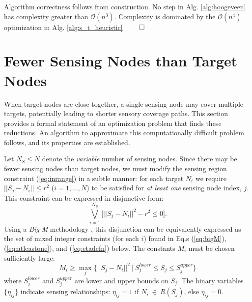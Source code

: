 \documentclass[letterpaper, 10 pt, conference]{ieeeconf}
\theoremstyle{definition}
\newcommand{\Os}{\mathcal{O}}
\begin{document}
Algorithm correctness follows from construction.  No step in Alg. \ref{alg:hoogeveen} has complexity greater than $\Os(n^3)$. Complexity is dominated by the $\Os(n^4)$ optimization in Alg. \ref{alg:s_t_heuristic} $\qed$

\section{Fewer Sensing Nodes than Target Nodes} \label{sec:fewer}

\noindent When target nodes are close together, a single sensing node may  cover multiple targets, potentially leading to shorter sensory coverage paths.  This section provides a formal statement of an optimization problem that finds these reductions. An algorithm to approximate this computationally difficult problem follows, and its properties are established.

Let $N_S\leq N$ denote the {\em variable} number of sensing nodes.
Since there may be fewer sensing nodes than target nodes, we must modify the sensing region constraint (\ref{eq:inrange}) in a subtle manner: for each target $N_i$ we require $||S_j - N_i|| \le r^2$ ($i=1,\ldots,N$) to be satisfied for {\em at least one} sensing node index, $j$.  This constraint can be expressed in disjunctive form:
   \[ \bigvee_{i=1}^{N_S} \big[ ||S_j - N_i||^2-r^2 \le 0 \big] .\]
Using a {\em Big-M} methodology \cite{vecchietti_modeling_2003}, this disjunction can be equivalently expressed as the set of mixed integer constraints (for each $i$) found in Eq.s (\ref{eq:bigM}), (\ref{eq:atleastone}), and (\ref{eq:etadefn}) below.  The constants $M_i$ must be chosen sufficiently large:
   \begin{equation} 
   M_i \ge \max_j\{ ||S_j-N_i||^2\ |\ S_j^{lower} \le S_j \le S_j^{upper}\}
   \end{equation}
where $S_j^{lower}$ and $S_j^{upper}$ are lower and upper bounds on $S_j$.  The binary variables $\{\eta_{ij}\}$ indicate sensing relationships: $\eta_{ij}=1$ if $N_i\ \in \ R(S_j)$, else $\eta_{ij}=0$.
\end{document}
